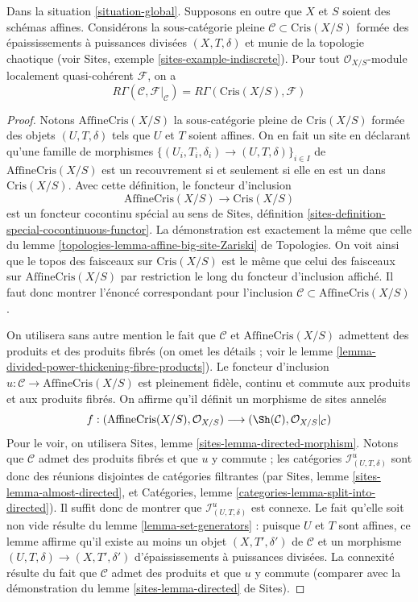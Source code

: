 \begin{lemma}
\label{lemma-compare}
Dans la situation \ref{situation-global}.
Supposons en outre que $X$ et $S$ soient des schémas affines.
Considérons la sous-catégorie pleine $\mathcal{C} \subset \text{Cris}(X/S)$
formée des épaississements à puissances divisées $(X, T, \delta)$
et munie de la topologie chaotique (voir
Sites, exemple \ref{sites-example-indiscrete}).
Pour tout $\mathcal{O}_{X/S}$-module localement quasi-cohérent $\mathcal{F}$,
on a
$$
R\Gamma(\mathcal{C}, \mathcal{F}|_\mathcal{C}) =
R\Gamma(\text{Cris}(X/S), \mathcal{F})
$$
\end{lemma}

\begin{proof}
Notons $\text{AffineCris}(X/S)$ la sous-catégorie pleine de $\text{Cris}(X/S)$
formée des objets $(U, T, \delta)$ tels que $U$ et $T$ soient affines.
On en fait un site en déclarant qu'une famille de morphismes
$\{(U_i, T_i, \delta_i) \to (U, T, \delta)\}_{i \in I}$ de
$\text{AffineCris}(X/S)$ est un recouvrement si et seulement si elle en est un
dans $\text{Cris}(X/S)$. Avec cette définition, le foncteur d'inclusion
$$
\text{AffineCris}(X/S) \longrightarrow \text{Cris}(X/S)
$$
est un foncteur cocontinu spécial au sens de
Sites, définition \ref{sites-definition-special-cocontinuous-functor}.
La démonstration est exactement la même que celle du
lemme \ref{topologies-lemma-affine-big-site-Zariski} de Topologies.
On voit ainsi que le topos des faisceaux sur $\text{Cris}(X/S)$
est le même que celui des faisceaux sur $\text{AffineCris}(X/S)$
par restriction le long du foncteur d'inclusion affiché.
Il faut donc montrer l'énoncé correspondant pour
l'inclusion $\mathcal{C} \subset \text{AffineCris}(X/S)$.

\medskip\noindent
On utilisera sans autre mention le fait que $\mathcal{C}$ et
$\text{AffineCris}(X/S)$ admettent des produits et des produits fibrés
(on omet les détails ; voir le
lemme \ref{lemma-divided-power-thickening-fibre-products}).
Le foncteur d'inclusion $u : \mathcal{C} \to \text{AffineCris}(X/S)$
est pleinement fidèle, continu et commute aux produits et aux produits fibrés.
On affirme qu'il définit un morphisme de sites annelés
$$
f :
(\text{AffineCris}(X/S), \mathcal{O}_{X/S})
\longrightarrow
(\Sh(\mathcal{C}), \mathcal{O}_{X/S}|_\mathcal{C})
$$
Pour le voir, on utilisera Sites, lemme \ref{sites-lemma-directed-morphism}.
Notons que $\mathcal{C}$ admet des produits fibrés et que $u$ y commute ;
les catégories $\mathcal{I}^u_{(U, T, \delta)}$ sont donc des réunions disjointes
de catégories filtrantes (par Sites, lemme \ref{sites-lemma-almost-directed}, et
Catégories, lemme \ref{categories-lemma-split-into-directed}). Il
suffit donc de montrer que $\mathcal{I}^u_{(U, T, \delta)}$ est connexe.
Le fait qu'elle soit non vide résulte du lemme \ref{lemma-set-generators} : puisque $U$ et $T$
sont affines, ce lemme affirme qu'il existe au moins un objet
$(X, T', \delta')$ de $\mathcal{C}$ et un morphisme
$(U, T, \delta) \to (X, T', \delta')$ d'épaississements à puissances divisées.
La connexité résulte du fait que $\mathcal{C}$ admet des produits
et que $u$ y commute (comparer avec la démonstration du
lemme \ref{sites-lemma-directed} de Sites).


\end{proof}
